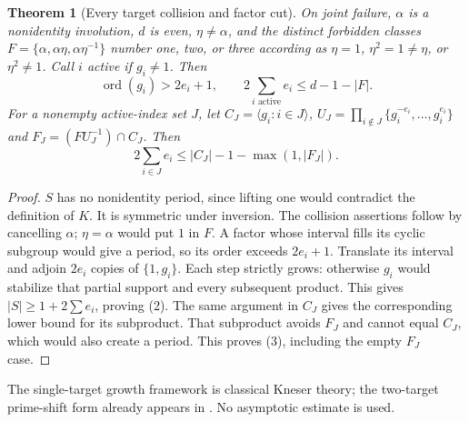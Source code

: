 \documentclass[10pt,a4paper]{article}
\newtheorem{theorem}{Theorem}
\begin{document}
\begin{theorem}[Every target collision and factor cut]
On joint failure, $\alpha$ is a nonidentity involution, $d$ is even,
$\eta\ne\alpha$, and the distinct forbidden classes
$F=\{\alpha,\alpha\eta,\alpha\eta^{-1}\}$ number one, two, or three
according as $\eta=1$, $\eta^2=1\ne\eta$, or $\eta^2\ne1$.
Call $i$ active if $g_i\ne1$. Then
\[
 \operatorname{ord}(g_i)>2e_i+1,\qquad
 \boxed{2\sum_{i\text{ active}}e_i\le d-1-|F|.}        \tag{2}
\]
For a nonempty active-index set $J$, let $C_J=\langle g_i:i\in J\rangle$,
$U_J=\prod_{i\notin J}\{g_i^{-e_i},\ldots,g_i^{e_i}\}$ and
$F_J=(FU_J^{-1})\cap C_J$. Then
\[
 \boxed{2\sum_{i\in J}e_i\le |C_J|-1-\max(1,|F_J|).}    \tag{3}
\]
\end{theorem}
\begin{proof}
$S$ has no nonidentity period, since lifting one would contradict the definition
of $K$. It is symmetric under inversion. The collision assertions follow by
cancelling $\alpha$; $\eta=\alpha$ would put $1$ in $F$.
A factor whose interval fills its cyclic subgroup would give a period, so its
order exceeds $2e_i+1$. Translate its interval and adjoin $2e_i$ copies of
$\{1,g_i\}$. Each step strictly grows: otherwise $g_i$ would stabilize that
partial support and every subsequent product. This gives $|S|\ge1+2\sum e_i$,
proving (2). The same argument in $C_J$ gives the corresponding lower bound
for its subproduct. That subproduct avoids $F_J$ and cannot equal $C_J$, which
would also create a period. This proves (3), including the empty $F_J$ case.
\end{proof}
The single-target growth framework is classical Kneser theory; the two-target
prime-shift form already appears in \cite{Bryan}. No asymptotic estimate is used.
\end{document}
